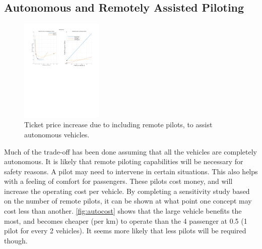 \subsection{Autonomous and Remotely Assisted Piloting}

\begin{figure}
    \centering
    \includegraphics[width=0.35\textwidth]{Figures/autonomous_TPrice_perkm.png}
    \captionsetup{justification=centering}
    \caption{Ticket price increase due to including remote pilots, to assist autonomous vehicles.}
    \label{fig:autocost}
\end{figure}

Much of the trade-off has been done assuming that all the vehicles are completely autonomous. It is likely that remote piloting capabilities will be necessary for safety reasons. A pilot may need to intervene in certain situations. This also helps with a feeling of comfort for passengers. These pilots cost money, and will increase the operating cost per vehicle. By completing a sensitivity study based on the number of remote pilots, it can be shown at what point one concept may cost less than another. \autoref{fig:autocost} shows that the large vehicle benefits the most, and becomes cheaper (per km) to operate than the 4 passenger at 0.5 (1 pilot for every 2 vehicles). It seems more likely that less pilots will be required though.
